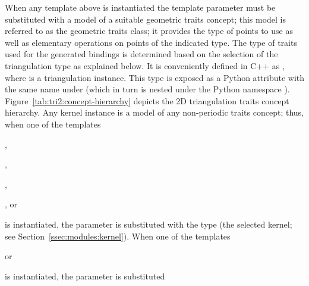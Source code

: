 When any template above is instantiated the template parameter
 must be substituted with a model of a suitable
geometric traits concept; this model is referred to as the geometric
traits class; it provides the type of points to use as well as
elementary operations on points of the indicated type. The type of
traits used for the generated bindings is determined based on the
selection of the triangulation type as explained below. It is
conveniently defined in C++ as , where
 is a triangulation instance. This type is exposed as
a Python attribute with the same name under
 (which in turn is nested under the
Python namespace ).
Figure~\ref{tab:tri2:concept-hierarchy} depicts the 2D triangulation
traits concept hierarchy. Any kernel instance is a model of any
non-periodic traits concept; thus, when one of the templates
\begin{compactenum}
\item {},
\item {},
\item {},
\item {}, or
\item {}
\end{compactenum}
is instantiated, the  parameter is substituted
with the  type (the selected kernel; see
Section~\ref{ssec:modules:kernel}). When one of the templates
\begin{compactenum}
\item {} or
\item {}
\end{compactenum}
is instantiated, the  parameter is substituted

